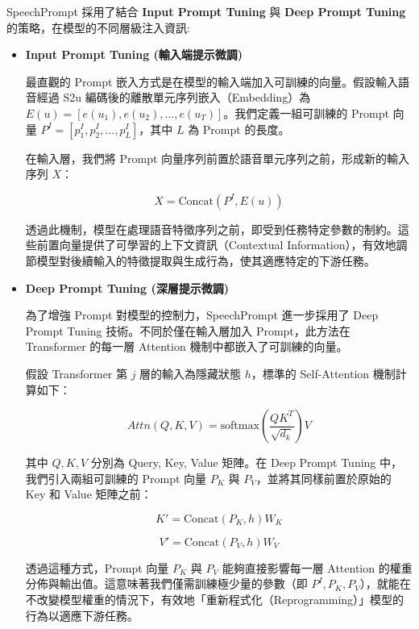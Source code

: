 SpeechPrompt 採用了結合 \textbf{Input Prompt Tuning} 與 \textbf{Deep Prompt Tuning} 的策略，在模型的不同層級注入資訊:

\begin{itemize}

\item \textbf{Input Prompt Tuning (輸入端提示微調)}

最直觀的 Prompt 嵌入方式是在模型的輸入端加入可訓練的向量。假設輸入語音經過 S2u 編碼後的離散單元序列嵌入（Embedding）為 $E(u) = [e(u_1), e(u_2), ..., e(u_T)]$。我們定義一組可訓練的 Prompt 向量 $P^I = [p^I_1, p^I_2, ..., p^I_L]$，其中 $L$ 為 Prompt 的長度。

在輸入層，我們將 Prompt 向量序列前置於語音單元序列之前，形成新的輸入序列 $X$：

\begin{equation}
X = \text{Concat}(P^I, E(u))
\end{equation}

透過此機制，模型在處理語音特徵序列之前，即受到任務特定參數的制約。這些前置向量提供了可學習的上下文資訊（Contextual Information），有效地調節模型對後續輸入的特徵提取與生成行為，使其適應特定的下游任務。

\item \textbf{Deep Prompt Tuning (深層提示微調)}

為了增強 Prompt 對模型的控制力，SpeechPrompt 進一步採用了 Deep Prompt Tuning 技術。不同於僅在輸入層加入 Prompt，此方法在 Transformer 的每一層 Attention 機制中都嵌入了可訓練的向量。

假設 Transformer 第 $j$ 層的輸入為隱藏狀態 $h$，標準的 Self-Attention 機制計算如下：

\begin{equation}
Attn(Q, K, V) = \text{softmax}\left(\frac{QK^T}{\sqrt{d_k}}\right)V
\end{equation}

其中 $Q, K, V$ 分別為 Query, Key, Value 矩陣。在 Deep Prompt Tuning 中，我們引入兩組可訓練的 Prompt 向量 $P_K$ 與 $P_V$，並將其同樣前置於原始的 Key 和 Value 矩陣之前：

\begin{equation}
K' = \text{Concat}(P_K, h)W_K
\end{equation}

\begin{equation}
V' = \text{Concat}(P_V, h)W_V
\end{equation}

透過這種方式，Prompt 向量 $P_K$ 與 $P_V$ 能夠直接影響每一層 Attention 的權重分佈與輸出值。這意味著我們僅需訓練極少量的參數（即 $P^I, P_K, P_V$），就能在不改變模型權重的情況下，有效地「重新程式化（Reprogramming）」模型的行為以適應下游任務。
\end{itemize}

